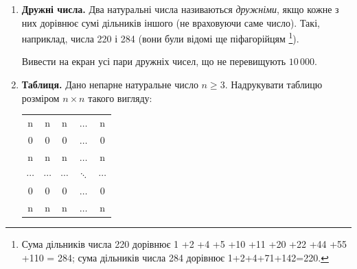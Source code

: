  


\begin{enumerate}
\item \textbf{Дружні числа.} Два натуральні числа називаються {\itshape дружніми}, якщо кожне з них дорівнює сумі дільників іншого (не враховуючи саме число). Такі, наприклад, числа 220 і 284 (вони були відомі ще піфагорійцям \footnote [1] {Сума дільників числа 220 дорівнює 1 +2 +4 +5 +10 +11 +20 +22 +44 +55 +110 = 284; сума дільників числа 284 дорівнює 1+2+4+71+142=220.}).

Вивести на екран усі пари дружніх чисел, що не перевищують $10\,000$.
\item \textbf{Таблиця.} Дано непарне натуральне число $n\geqslant 3$. Надрукувати таблицю розміром $n\times n$ такого вигляду:
{\ttfamily
\begin{center}
\setlength{\tabcolsep}{6pt}
\begin{tabular}{ccccc}
n & n & n & $\ldots$ & n \\
0 & 0 & 0 & $\ldots$ & 0 \\
n & n & n & $\ldots$ & n  \\
$\cdots$ & $\cdots$ & $\cdots$ & $\ddots$ & $\cdots$ \\
0 & 0 & 0 & $\ldots$ & 0 \\
n & n & n & $\ldots$ & n 
\end{tabular}
\end{center}
}
\end{enumerate}

